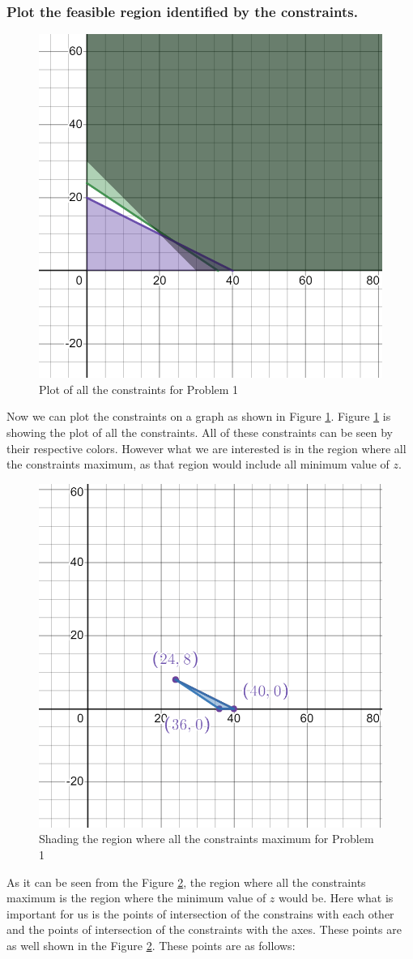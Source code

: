 \documentclass[unicode,11pt,a4paper,oneside,numbers=endperiod,openany]{scrartcl}
\begin{document}
\subsubsection{Plot the feasible region identiﬁed by the constraints.}

\begin{figure}[H]
	\centering
	\includegraphics[width=0.5\linewidth]{figures/problem_1.1.1.png}
	\caption{Plot of all the constraints for Problem 1}
	\label{fig:problem_1.1}
\end{figure}
Now we can plot the constraints on a graph as shown in Figure \ref{fig:problem_1.1}. Figure \ref{fig:problem_1.1} is showing the plot of all the constraints. All of these constraints can be seen by their respective colors. However what we are interested is in the region where all the constraints maximum, as that region would include all minimum value of $z$.

\begin{figure}[H]
	\centering
	\includegraphics[width=0.5\linewidth]{figures/problem_1.1.2.png}
	\caption{Shading the region where all the constraints maximum for Problem 1}
	\label{fig:problem_1.2}
\end{figure}

As it can be seen from the Figure \ref{fig:problem_1.2}, the region where all the constraints maximum is the region where the minimum value of $z$ would be. Here what is important for us is the points of intersection of the constrains with each other and the points of intersection of the constraints with the axes. These points are as well shown in the Figure \ref{fig:problem_1.2}. These points are as follows:
\end{document}

